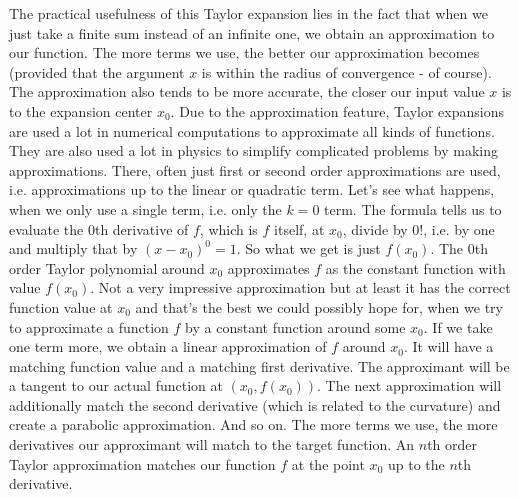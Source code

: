 \medskip
The practical usefulness of this Taylor expansion lies in the fact that when we just take a finite sum instead of an infinite one, we obtain an approximation to our function. The more terms we use, the better our approximation becomes (provided that the argument $x$ is within the radius of convergence - of course). The approximation also tends to be more accurate, the closer our input value $x$ is to the expansion center $x_0$. Due to the approximation feature, Taylor expansions are used a lot in numerical computations to approximate all kinds of functions. They are also used a lot in physics to simplify complicated problems by making approximations. There, often just first or second order approximations are used, i.e. approximations up to the linear or quadratic term. Let's see what happens, when we only use a single term, i.e. only the $k=0$ term. The formula tells us to evaluate the $0$th derivative of $f$, which is $f$ itself, at $x_0$, divide by $0!$, i.e. by one and multiply that by $(x-x_0)^0 = 1$. So what we get is just $f(x_0)$. The $0$th order Taylor polynomial around $x_0$ approximates $f$ as the constant function with value $f(x_0)$. Not a very impressive approximation but at least it has the correct function value at $x_0$ and that's the best we could possibly hope for, when we try to approximate a function $f$ by a constant function around some $x_0$. If we take one term more, we obtain a linear approximation of $f$ around $x_0$. It will have a matching function value and a matching first derivative. The approximant will be a tangent to our actual function at $(x_0, f(x_0))$. The next approximation will additionally match the second derivative (which is related to the curvature) and create a parabolic approximation. And so on. The more terms we use, the more derivatives our approximant will match to the target function. An $n$th order Taylor approximation matches our function $f$ at the point $x_0$ up to the $n$th derivative.


